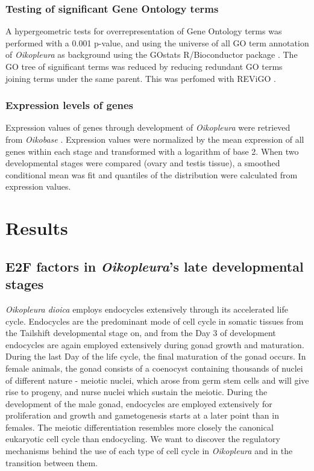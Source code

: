 \documentclass[11pt,twoside,a4paper]{report}
\begin{document}
		\subsection{Testing of significant Gene Ontology terms}
			A hypergeometric tests for overrepresentation of Gene Ontology terms was performed with a 0.001 p-value, and using the universe of all GO term annotation of \textit{Oikopleura} as background using the GOstats R/Bioconductor package \cite{Falcon2007}. The GO tree of significant terms was reduced by reducing redundant GO terms joining terms under the same parent. This was perfomed with REViGO \cite{Supek2011}.
			
		\subsection{Expression levels of genes}
			Expression values of genes through development of \textit{Oikopleura} were retrieved from \textit{Oikobase} \cite{Danks2013}. Expression values were normalized by the mean expression of all genes within each stage and transformed with a logarithm of base 2. When two developmental stages were compared (ovary and testis tissue), a smoothed conditional mean was fit and quantiles of the distribution were calculated from expression values.
		

\cleardoublepage


\chapter{Results}

\section{E2F factors in \textit{Oikopleura}'s late developmental stages}
	\textit{Oikopleura dioica} employs endocycles extensively through its accelerated life cycle. Endocycles are the predominant mode of cell cycle in somatic tissues from the Tailshift developmental stage on, and from the Day 3 of development endocycles are again employed extensively during gonad growth and maturation. During the last Day of the life cycle, the final maturation of the gonad occurs. In female animals, the gonad consists of a coenocyst containing thousands of nuclei of different nature - meiotic nuclei, which arose from germ stem cells and will give rise to progeny, and nurse nuclei which sustain the meiotic. During the development of the male gonad, endocycles are employed extensively for proliferation and growth and gametogenesis starts at a later point than in females. The meiotic differentiation resembles more closely the canonical eukaryotic cell cycle than endocycling. We want to discover the regulatory mechanisms behind the use of each type of cell cycle in \textit{Oikopleura} and in the transition between them.
	
\end{document}
